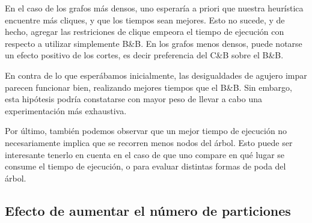 En el caso de los grafos más densos, uno esperaría a priori que nuestra heurística encuentre más cliques, y que los tiempos sean mejores. Esto no sucede, y de hecho, agregar las restriciones de clique empeora el tiempo de ejecución con respecto a utilizar simplemente B\&B. En los grafos menos densos, puede notarse un efecto positivo de los cortes, es decir preferencia del C\&B sobre el B\&B.

En contra de lo que esperábamos inicialmente, las desigualdades de agujero impar parecen funcionar bien, realizando mejores tiempos que el B\&B. Sin embargo, esta hipótesis podría constatarse con mayor peso de llevar a cabo una experimentación más exhaustiva.

Por último, también podemos observar que un mejor tiempo de ejecución no necesariamente implica que se recorren menos nodos del árbol. Esto puede ser interesante tenerlo en cuenta en el caso de que uno compare en qué lugar se consume el tiempo de ejecución, o para evaluar distintas formas de poda del árbol.

\subsection{Efecto de aumentar el número de particiones}

